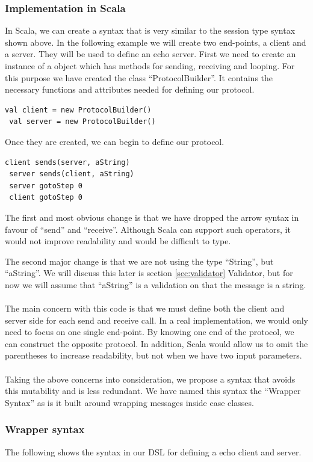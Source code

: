 \subsubsection{Implementation in Scala}
In Scala, we can create a syntax that is very similar to the session type syntax shown above. In the following example we will create two end-points, a client and a server. They will be used to define an echo server. First we need to create an instance of a object which has methods for sending, receiving and looping. For this purpose we have created the class ``ProtocolBuilder''. It contains the necessary functions and attributes needed for defining our protocol.
\begin{lstlisting}[style=myScalastyle]
 val client = new ProtocolBuilder()
 val server = new ProtocolBuilder()
\end{lstlisting}
Once they are created, we can begin to define our protocol.
\begin{lstlisting}[style=myScalastyle]
 client sends(server, aString)
 server sends(client, aString)
 server gotoStep 0
 client gotoStep 0 
\end{lstlisting}
The first and most obvious change is that we have dropped the arrow syntax in favour of ``send'' and ``receive''. Although Scala can support such operators, it would not improve readability and would be difficult to type.

The second major change is that we are not using the type ``String'', but ``aString''. We will discuss this later is section {\ref{sec:validator} Validator}, but for now we will assume that ``aString'' is a validation on that the message is a string.   
\\\\
The main concern with this code is that we must define both the client and server side for each send and receive call. In a real implementation, we would only need to focus on one single end-point. By knowing one end of the protocol, we can construct the opposite protocol. In addition, Scala would allow us to omit the parentheses to increase readability, but not when we have two input parameters.
\\\\
Taking the above concerns into consideration, we propose a syntax that avoids this mutability and is less redundant. We have named this syntax the ``Wrapper Syntax'' as is it built around wrapping messages inside case classes. 

\subsubsection{Wrapper syntax}
The following shows the syntax in our DSL for defining a echo client and server.

